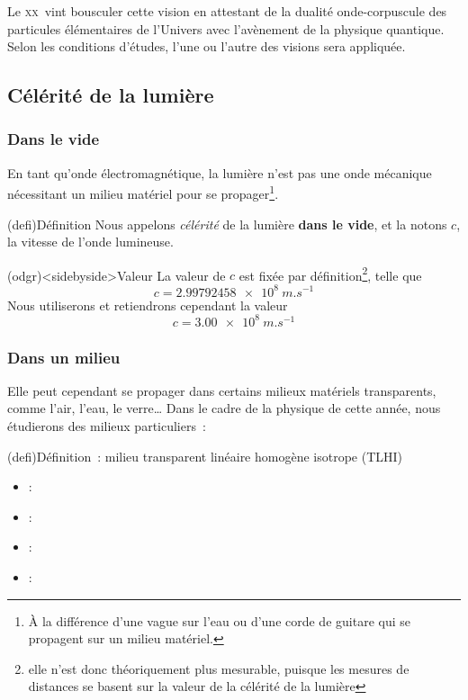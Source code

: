 \documentclass[../../main/main.tex]{subfiles}
\begin{document}


Le \textsc{xx}\ieme\ vint bousculer cette vision en attestant de la dualité
onde-corpuscule des particules élémentaires de l'Univers avec l'avènement de la
physique quantique. Selon les conditions d'études, l'une ou l'autre des visions
sera appliquée.

\subsection{Célérité de la lumière}

\subsubsection{Dans le vide}

En tant qu'onde électromagnétique, la lumière n'est pas une onde mécanique
nécessitant un milieu matériel pour se propager\footnote{À la différence d'une
	vague sur l'eau ou d'une corde de guitare qui se propagent sur un milieu
	matériel.}.
\begin{tcb}(defi){Définition}
	Nous appelons \textit{célérité} de la lumière \textbf{dans le vide}, et
	la notons $c$, la vitesse de l'onde lumineuse.
\end{tcb}
\begin{tcb}(odgr)<sidebyside>{Valeur}
	La valeur de $c$ est fixée par définition\footnote{elle n'est donc
		théoriquement plus mesurable, puisque les mesures de distances se basent sur
		la valeur de la célérité de la lumière}, telle que
	\[c = \SI{2.99792458e8}{m.s^{-1}}\]
	\tcblower
	Nous utiliserons et retiendrons cependant la valeur
	\[\boxed{c = \SI{3.00e8}{m.s^{-1}}}\]
\end{tcb}

\subsubsection{Dans un milieu}

Elle peut cependant se propager dans certains milieux matériels transparents,
comme l'air, l'eau, le verre… Dans le cadre de la physique de cette année, nous
étudierons des milieux particuliers~:

\begin{tcb}(defi){Définition~: milieu transparent linéaire homogène isotrope (TLHI)}
	\begin{itemize}[leftmargin=66pt]
		\item[\textbf{Transparent}] : 
		\item[\textbf{Linéaire}] : 
		\item[\textbf{Homogène}] : 
		\item[\textbf{Isotrope}] : 
	\end{itemize}
\end{tcb}
\end{document}
